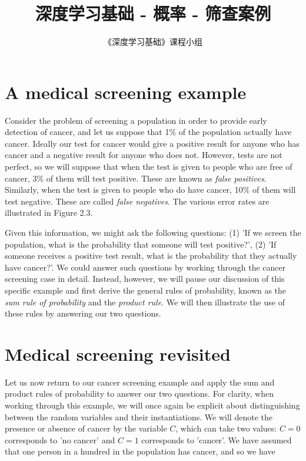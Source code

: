 \documentclass{article}
\title{深度学习基础 - 概率 - 筛查案例}
\author{《深度学习基础》课程小组}
\begin{document}
\maketitle
\tableofcontents

\section{A medical screening example}

Consider the problem of screening a population in order to provide early detection of cancer, and let us suppose that 1\% of the population actually have cancer. Ideally our test for cancer would give a positive result for anyone who has cancer and a negative result for anyone who does not. However, tests are not perfect, so we will suppose that when the test is given to people who are free of cancer, 3\% of them will test positive. These are known as \textit{false positives}. Similarly, when the test is given to people who do have cancer, 10\% of them will test negative. These are called \textit{false negatives}. The various error rates are illustrated in Figure 2.3.

Given this information, we might ask the following questions: (1) 'If we screen the population, what is the probability that someone will test positive?', (2) 'If someone receives a positive test result, what is the probability that they actually have cancer?'. We could answer such questions by working through the cancer screening case in detail. Instead, however, we will pause our discussion of this specific example and first derive the general rules of probability, known as the \textit{sum rule of probability} and the \textit{product rule}. We will then illustrate the use of these rules by answering our two questions.

\section{Medical screening revisited}

Let us now return to our cancer screening example and apply the sum and product rules of probability to answer our two questions. For clarity, when working through this example, we will once again be explicit about distinguishing between the random variables and their instantiations. We will denote the presence or absence of cancer by the variable $C$, which can take two values: $C = 0$ corresponds to 'no cancer' and $C = 1$ corresponds to 'cancer'. We have assumed that one person in a hundred in the population has cancer, and so we have
\end{document}
